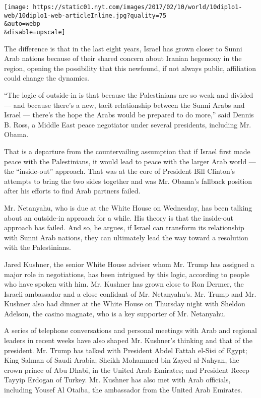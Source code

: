 \texttt{[image: https://static01.nyt.com/images/2017/02/10/world/10diplo1-web/10diplo1-web-articleInline.jpg?quality=75\\\&auto=webp\\\&disable=upscale]}

The difference is that in the last eight years, Israel has grown closer
to Sunni Arab nations because of their shared concern about Iranian
hegemony in the region, opening the possibility that this newfound, if
not always public, affiliation could change the dynamics.

``The logic of outside-in is that because the Palestinians are so weak
and divided --- and because there's a new, tacit relationship between
the Sunni Arabs and Israel --- there's the hope the Arabs would be
prepared to do more,'' said Dennis B. Ross, a Middle East peace
negotiator under several presidents, including Mr. Obama.

That is a departure from the countervailing assumption that if Israel
first made peace with the Palestinians, it would lead to peace with the
larger Arab world --- the ``inside-out'' approach. That was at the core
of President Bill Clinton's attempts to bring the two sides together and
was Mr. Obama's fallback position after his efforts to find Arab
partners failed.

Mr. Netanyahu, who is due at the White House on Wednesday, has been
talking about an outside-in approach for a while. His theory is that the
inside-out approach has failed. And so, he argues, if Israel can
transform its relationship with Sunni Arab nations, they can ultimately
lead the way toward a resolution with the Palestinians.

Jared Kushner, the senior White House adviser whom Mr. Trump has
assigned a major role in negotiations, has been intrigued by this logic,
according to people who have spoken with him. Mr. Kushner has grown
close to Ron Dermer, the Israeli ambassador and a close confidant of Mr.
Netanyahu's. Mr. Trump and Mr. Kushner also had dinner at the White
House on Thursday night with Sheldon Adelson, the casino magnate, who is
a key supporter of Mr. Netanyahu.

A series of telephone conversations and personal meetings with Arab and
regional leaders in recent weeks have also shaped Mr. Kushner's thinking
and that of the president. Mr. Trump has talked with President Abdel
Fattah el-Sisi of Egypt; King Salman of Saudi Arabia; Sheikh Mohammed
bin Zayed al-Nahyan, the crown prince of Abu Dhabi, in the United Arab
Emirates; and President Recep Tayyip Erdogan of Turkey. Mr. Kushner has
also met with Arab officials, including Yousef Al Otaiba, the ambassador
from the United Arab Emirates.

